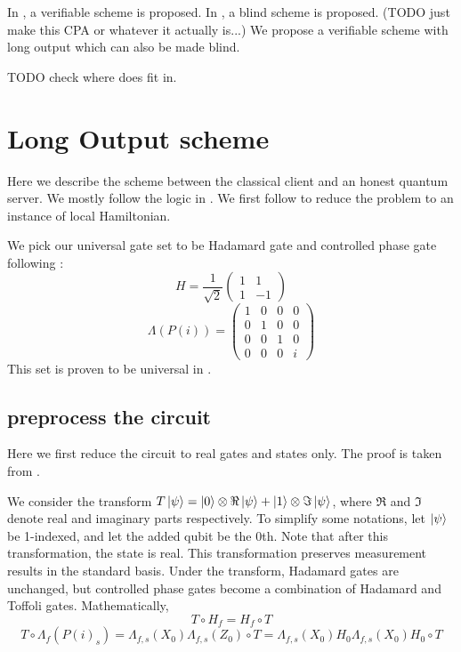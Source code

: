 \documentclass{article}
\theoremstyle{definition}
\begin{document}
In \cite{mahadev_delegation}, a verifiable scheme is proposed. In \cite{mahadev_qfhe}, a blind scheme is proposed. (TODO just make this CPA or whatever it actually is...) We propose a verifiable scheme with long output which can also be made blind.

TODO check where does \cite{1904.06320} fit in.

\section{Long Output scheme}

Here we describe the scheme between the classical client and an honest quantum server. We mostly follow the logic in \cite{mahadev_delegation}. We first follow \cite{kempe_kitaev_regev_2006} to reduce the problem to an instance of local Hamiltonian.

We pick our universal gate set to be Hadamard gate and controlled phase gate following \cite{quant-ph/0301040}:
$$H=\frac{1}{\sqrt{2}}\begin{pmatrix}1&1\\1&-1\end{pmatrix}$$
$$\Lambda(P(i))=\begin{pmatrix}1&0&0&0\\0&1&0&0\\0&0&1&0\\0&0&0&i\end{pmatrix}$$
This set is proven to be universal in \cite{kitaev_1997}.

\subsection{preprocess the circuit}

Here we first reduce the circuit to real gates and states only. The proof is taken from \cite{quant-ph/0301040}.

We consider the transform $T\ket{\psi}=\ket{0}\otimes\Re\ket{\psi}+\ket{1}\otimes\Im\ket{\psi}$, where $\Re$ and $\Im$ denote real and imaginary parts respectively. To simplify some notations, let $\ket{\psi}$ be 1-indexed, and let the added qubit be the 0th. Note that after this transformation, the state is real. This transformation preserves measurement results in the standard basis. Under the transform, Hadamard gates are unchanged, but controlled phase gates become a combination of Hadamard and Toffoli gates. Mathematically,
$$T\circ H_f=H_f\circ T$$
$$T\circ\Lambda_f(P(i)_s)=\Lambda_{f,s}(X_0)\Lambda_{f,s}(Z_0)\circ T=\Lambda_{f,s}(X_0)H_0\Lambda_{f,s}(X_0)H_0\circ T$$
\end{document}
